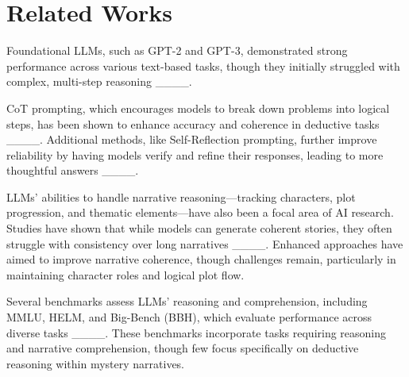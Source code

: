 \section{Related Works}
Foundational LLMs, such as GPT-2 and GPT-3, demonstrated strong performance across various text-based tasks, though they initially struggled with complex, multi-step reasoning ____. 



CoT prompting, which encourages models to break down problems into logical steps, has been shown to enhance accuracy and coherence in deductive tasks ____. 
Additional methods, like Self-Reflection prompting, further improve reliability by having models verify and refine their responses, leading to more thoughtful answers ____.


LLMs' abilities to handle narrative reasoning—tracking characters, plot progression, and thematic elements—have also been a focal area of AI research. 
Studies have shown that while models can generate coherent stories, they often struggle with consistency over long narratives ____. 
Enhanced approaches have aimed to improve narrative coherence, though challenges remain, particularly in maintaining character roles and logical plot flow.


Several benchmarks assess LLMs’ reasoning and comprehension, including MMLU, HELM, and Big-Bench (BBH), which evaluate performance across diverse tasks ____. 
These benchmarks incorporate tasks requiring reasoning and narrative comprehension, though few focus specifically on deductive reasoning within mystery narratives.



%